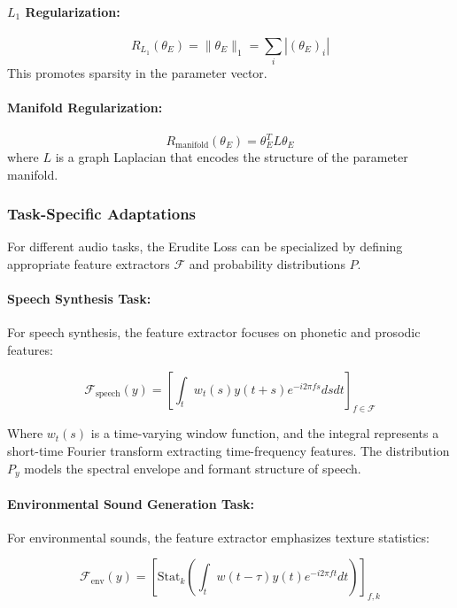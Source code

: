 \paragraph{$L_1$ Regularization:}
\begin{equation}
R_{L_1}(\theta_E) = \|\theta_E\|_1 = \sum_i |(\theta_E)_i|
\end{equation}
This promotes sparsity in the parameter vector.

\paragraph{Manifold Regularization:}
\begin{equation}
R_{\text{manifold}}(\theta_E) = \theta_E^T L \theta_E
\end{equation}
where $L$ is a graph Laplacian that encodes the structure of the parameter manifold.

\subsubsection{Task-Specific Adaptations}

For different audio tasks, the Erudite Loss can be specialized by defining appropriate feature extractors $\mathcal{F}$ and probability distributions $P$.

\paragraph{Speech Synthesis Task:}
For speech synthesis, the feature extractor focuses on phonetic and prosodic features:

\begin{equation}
\mathcal{F}_{\text{speech}}(y) = \left[ \int_t w_t(s) y(t+s) e^{-i2\pi fs} dsdt \right]_{f \in \mathcal{F}}
\end{equation}

Where $w_t(s)$ is a time-varying window function, and the integral represents a short-time Fourier transform extracting time-frequency features. The distribution $P_y$ models the spectral envelope and formant structure of speech.

\paragraph{Environmental Sound Generation Task:}
For environmental sounds, the feature extractor emphasizes texture statistics:

\begin{equation}
\mathcal{F}_{\text{env}}(y) = \left[ \text{Stat}_k\left( \int_t w(t-\tau) y(t) e^{-i2\pi f t} dt \right) \right]_{f,k}
\end{equation}

